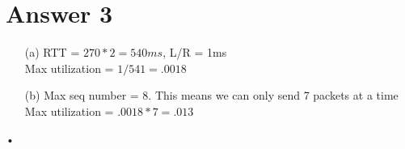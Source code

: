 \documentclass[11pt]{article}
\theoremstyle{definition}
\begin{document}
\section*{Answer 3}
\begin{enumerate}
\item[(a)] RTT = $270*2 = 540ms$, L/R = 1ms\\
Max utilization = $1 / 541 = .0018$

\item[(b)] Max seq number = 8.  This means we can only send 7 packets at a time\\
Max utilization = $.0018 * 7 = .013$
\end{enumerate}•
\end{document}
